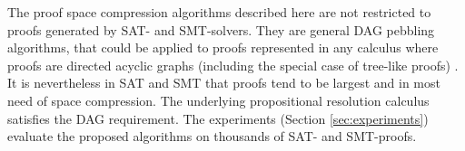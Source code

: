 The proof space compression algorithms described here are not restricted to proofs generated by SAT- and SMT-solvers. They are general DAG pebbling algorithms, that could be applied to proofs represented in any calculus where proofs are directed acyclic graphs (including the special case of tree-like proofs) \cite{APPA}. It is nevertheless in SAT and SMT that proofs tend to be largest and in most need of space compression. The underlying propositional resolution calculus satisfies the DAG requirement. The experiments (Section \ref{sec:experiments}) evaluate the proposed algorithms on thousands of SAT- and SMT-proofs.


